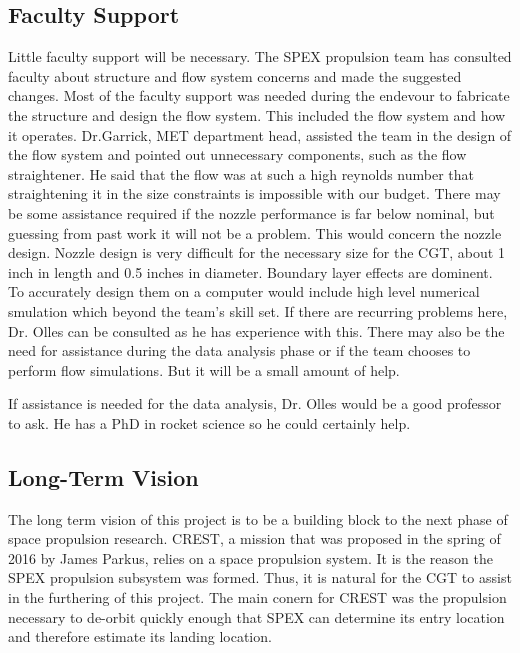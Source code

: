 \documentclass[conference]{IEEEtran} %
\begin{document}
\subsection{Faculty Support}
Little faculty support will be necessary. The SPEX propulsion team has consulted faculty about structure and flow system concerns and made the suggested changes. Most of the
faculty support was needed during the endevour to fabricate the structure and design the flow system.
This included the flow system and how it operates. Dr.Garrick, MET department head, assisted the team in the design of the flow system and pointed out unnecessary components, such
as the flow straightener. He said that the flow was at such a high reynolds number that straightening it in the size constraints is impossible with our budget.
There may be some assistance required if the nozzle performance is far below nominal, but guessing from past work it will not be a problem. This would concern the nozzle design.
Nozzle design is very difficult for the necessary size for the CGT, about 1 inch in length and 0.5 inches in diameter. Boundary layer effects are dominent. To accurately design them
on a computer would include high level numerical smulation which beyond the team's skill set. If there are recurring problems here, Dr. Olles can be consulted as he has experience with this.
There may also be the need for assistance during the data analysis phase or if the team chooses to perform flow simulations. But it will be a small amount of help.

If assistance is needed for the data analysis, Dr. Olles would be a good professor to ask. He has a PhD in rocket science
so he could certainly help.
\subsection{Long-Term Vision}
\label{sec:vision}

The long term vision of this project is to be a building block to the next phase of space propulsion research. CREST, a mission that was proposed in the
spring of 2016 by James Parkus, relies on a space propulsion system. It is the reason the SPEX propulsion subsystem was formed. Thus, it is natural for the
CGT to assist in the furthering of this project. The main conern for CREST was the propulsion necessary to de-orbit quickly enough that SPEX can determine its entry location and therefore estimate its landing location.
\end{document}
